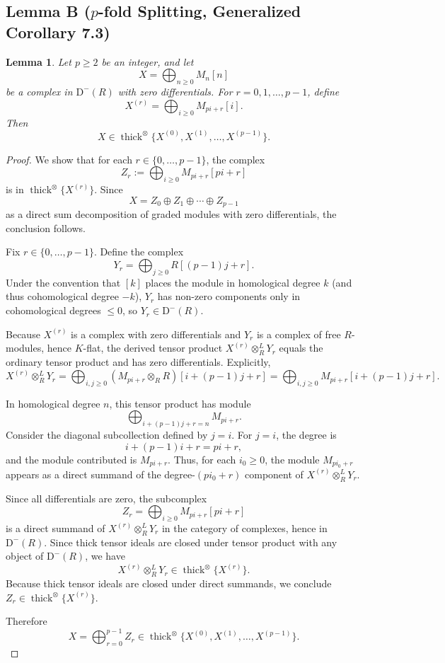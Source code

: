\documentclass[11pt]{article}
\newtheorem{lemma}{Lemma}
\newcommand{\Db}{\mathrm{D}^{-}(R)}
\newcommand{\thicktensor}[1]{\operatorname{thick}^{\otimes}\{#1\}}
\begin{document}
\subsection*{Lemma B ($p$-fold Splitting, Generalized Corollary 7.3)}

\begin{lemma}
Let $p \geqslant 2$ be an integer, and let
\[
X=\bigoplus_{n \geqslant 0} M_n[n]
\]
be a complex in $\Db$ with zero differentials. For $r=0,1,\ldots,p-1$, define
\[
X^{(r)}=\bigoplus_{i \geqslant 0} M_{pi+r}[i].
\]
Then
\[
X \in \thicktensor{X^{(0)},X^{(1)},\ldots,X^{(p-1)}}.
\]
\end{lemma}

\begin{proof}
We show that for each $r \in \{0,\ldots,p-1\}$, the complex
\[
Z_r:=\bigoplus_{i \geqslant 0} M_{pi+r}[pi+r]
\]
is in $\thicktensor{X^{(r)}}$. Since
\[
X=Z_0 \oplus Z_1 \oplus \cdots \oplus Z_{p-1}
\]
as a direct sum decomposition of graded modules with zero differentials, the conclusion follows.

Fix $r \in \{0,\ldots,p-1\}$. Define the complex
\[
Y_r=\bigoplus_{j \geqslant 0} R[(p-1)j+r].
\]
Under the convention that $[k]$ places the module in homological degree $k$ (and thus cohomological degree $-k$), $Y_r$ has non-zero components only in cohomological degrees $\leqslant 0$, so $Y_r \in \Db$.

Because $X^{(r)}$ is a complex with zero differentials and $Y_r$ is a complex of free $R$-modules, hence $K$-flat, the derived tensor product $X^{(r)} \otimes_R^{L} Y_r$ equals the ordinary tensor product and has zero differentials. Explicitly,
\[
X^{(r)} \otimes_R^{L} Y_r
=
\bigoplus_{i,j \geqslant 0}(M_{pi+r}\otimes_R R)[i+(p-1)j+r]
=
\bigoplus_{i,j \geqslant 0} M_{pi+r}[i+(p-1)j+r].
\]

In homological degree $n$, this tensor product has module
\[
\bigoplus_{i+(p-1)j+r=n} M_{pi+r}.
\]
Consider the diagonal subcollection defined by $j=i$. For $j=i$, the degree is
\[
i+(p-1)i+r=pi+r,
\]
and the module contributed is $M_{pi+r}$. Thus, for each $i_0 \geqslant 0$, the module $M_{pi_0+r}$ appears as a direct summand of the degree-$(pi_0+r)$ component of $X^{(r)} \otimes_R^{L} Y_r$.

Since all differentials are zero, the subcomplex
\[
Z_r=\bigoplus_{i \geqslant 0} M_{pi+r}[pi+r]
\]
is a direct summand of $X^{(r)} \otimes_R^{L} Y_r$ in the category of complexes, hence in $\Db$. Since thick tensor ideals are closed under tensor product with any object of $\Db$, we have
\[
X^{(r)} \otimes_R^{L} Y_r \in \thicktensor{X^{(r)}}.
\]
Because thick tensor ideals are closed under direct summands, we conclude $Z_r \in \thicktensor{X^{(r)}}$.

Therefore
\[
X=\bigoplus_{r=0}^{p-1} Z_r \in \thicktensor{X^{(0)},X^{(1)},\ldots,X^{(p-1)}}.
\]
\end{proof}
\end{document}
